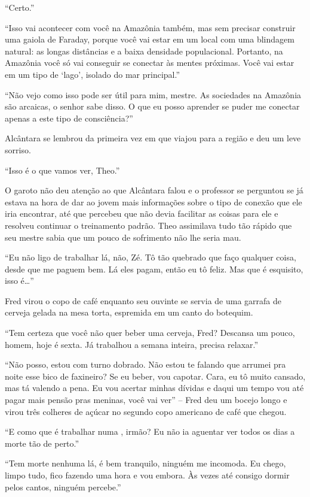 ``Certo.''

``Isso vai acontecer com você na Amazônia também, mas sem precisar
construir uma gaiola de Faraday, porque você vai estar em um local com
uma blindagem natural: as longas distâncias e a baixa densidade
populacional. Portanto, na Amazônia você só vai conseguir se conectar às
mentes próximas. Você vai estar em um tipo de `lago', isolado do mar
principal.''

``Não vejo como isso pode ser útil para mim, mestre. As sociedades na
Amazônia são arcaicas, o senhor sabe disso. O que eu posso aprender se
puder me conectar apenas a este tipo de consciência?''

Alcântara se lembrou da primeira vez em que viajou para a região e deu
um leve sorriso.

``Isso é o que vamos ver, Theo.''

O garoto não deu atenção ao que Alcântara falou e o professor se
perguntou se já estava na hora de dar ao jovem mais informações sobre o
tipo de conexão que ele iria encontrar, até que percebeu que não devia
facilitar as coisas para ele e resolveu continuar o treinamento padrão.
Theo assimilava tudo tão rápido que seu mestre sabia que um pouco de
sofrimento não lhe seria mau.

\asterisc

``Eu não ligo de trabalhar lá, não, Zé. Tô tão quebrado que faço
qualquer coisa, desde que me paguem bem. Lá eles pagam, então eu tô
feliz. Mas que é esquisito, isso é\ldots{}''

Fred virou o copo de café enquanto seu ouvinte se servia de uma garrafa
de cerveja gelada na mesa torta, espremida em um canto do botequim.

``Tem certeza que você não quer beber uma cerveja, Fred? Descansa um
pouco, homem, hoje é sexta. Já trabalhou a semana inteira, precisa
relaxar.''

``Não posso, estou com turno dobrado. Não estou te falando que arrumei
pra noite esse bico de faxineiro? Se eu beber, vou capotar. Cara, eu tô
muito cansado, mas tá valendo a pena. Eu vou acertar minhas dívidas e
daqui um tempo vou até pagar mais pensão pras meninas, você vai ver'' --
Fred deu um bocejo longo e virou três colheres de açúcar no segundo copo
americano de café que chegou.

``E como que é trabalhar numa , irmão? Eu não ia aguentar ver todos
os dias a morte tão de perto.''

``Tem morte nenhuma lá, é bem tranquilo, ninguém me incomoda. Eu chego,
limpo tudo, fico fazendo uma hora e vou embora. Às vezes até consigo
dormir pelos cantos, ninguém percebe.''

